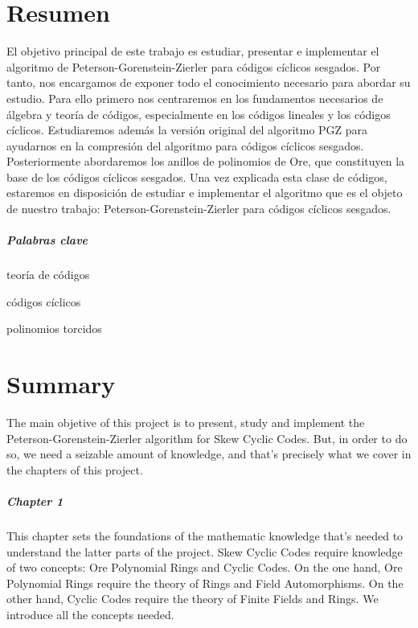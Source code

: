 \chapter*{Resumen}

El objetivo principal de este trabajo es estudiar, presentar e implementar el algoritmo de Peterson-Gorenstein-Zierler para códigos cíclicos sesgados.
Por tanto, nos encargamos de exponer todo el conocimiento necesario para abordar su estudio.
Para ello primero nos centraremos en los fundamentos necesarios de álgebra y teoría de códigos, especialmente en los códigos lineales y los códigos cíclicos.
Estudiaremos además la versión original del algoritmo PGZ para ayudarnos en la compresión del algoritmo para códigos cíclicos sesgados.
Posteriormente abordaremos los anillos de polinomios de Ore, que constituyen la base de los códigos cíclicos sesgados.
Una vez explicada esta clase de códigos, estaremos en disposición de estudiar e implementar el algoritmo que es el objeto de nuestro trabajo:  Peterson-Gorenstein-Zierler para códigos cíclicos sesgados.

\paragraph{Palabras clave}
\begin{itemize*}[label=,itemsep=4em,itemjoin=\hspace{2em}]
  \item teoría de códigos
  \item códigos cíclicos
  \item polinomios torcidos
\end{itemize*}

\chapter*{Summary}

The main objetive of this project is to present, study and implement the Peterson-Gorenstein-Zierler algorithm for Skew Cyclic Codes.
But, in order to do so, we need a seizable amount of knowledge, and that's precisely what we cover in the chapters of this project.

\paragraph{Chapter 1} This chapter sets the foundations of the mathematic knowledge that's needed to understand the latter parts of the project. 
Skew Cyclic Codes require knowledge of two concepts: Ore Polynomial Rings and Cyclic Codes. 
On the one hand, Ore Polynomial Rings require the theory of Rings and Field Automorphisms. 
On the other hand, Cyclic Codes require the theory of Finite Fields and Rings. 
We introduce all the concepts needed.


